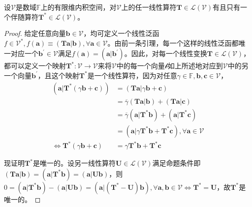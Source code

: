 \documentclass[main.tex]{subfiles}
\begin{document}
\begin{theorem}
设$\mathcal{V}$是数域$\mathbb{F}$上的有限维内积空间，对$\mathcal{V}$上的任一线性算符$\mathbf{T}\in\mathcal{L}\left(\mathcal{V}\right)$有且只有一个伴随算符$\mathbf{T}^*\in\mathcal{L}\left(\mathcal{V}\right)$。
\end{theorem}
\begin{proof}
给定任意向量$\mathbf{b}\in\mathcal{V}$，均可定义一个线性泛函$f\in\mathcal{V}^*,f\left(\mathbf{a}\right)\equiv\left(\mathbf{Ta}|\mathbf{b}\right),\forall\mathbf{a}\in\mathcal{V}$。由前一条引理，每一个这样的线性泛函都唯一对应一个$\mathbf{b}^\prime\in\mathcal{V}$满足$f\left(\mathbf{a}\right)=\left(\mathbf{a}|\mathbf{b}^\prime\right)$。因此，对每一个线性变换$\mathbf{T}\in\mathcal{L}\left(\mathcal{V}\right)$，都可以定义一个映射$\mathbf{T}^*:\mathcal{V}\rightarrow\mathcal{V}$来将$\mathcal{V}$中的每一个向量$\mathcal{b}$如上所述地对应到$\mathcal{V}$中的另一个向量$\mathbf{b}^\prime$，且这个映射$\mathbf{T}^*$是一个线性算符，因为对任意$\gamma\in\mathbb{F},\mathbf{b},\mathbf{c}\in\mathcal{V}$，
\begin{align*}
    \left(\mathbf{a}|\mathbf{T}^*\left(\gamma\mathbf{b}+\mathbf{c}\right)\right)&=\left(\mathbf{Ta}|\gamma\mathbf{b}+\mathbf{c}\right)\\
    &=\overline{\gamma}\left(\mathbf{Ta}|\mathbf{b}\right)+\left(\mathbf{Ta}|\mathbf{c}\right)\\
    &=\overline{\gamma}\left(\mathbf{a}|\mathbf{T}^*\mathbf{b}\right)+\left(\mathbf{a}|\mathbf{T}^*\mathbf{c}\right)\\
    &=\left(\mathbf{a}|\gamma\mathbf{T}^*\mathbf{b}+\mathbf{T}^*\mathbf{c}\right),\forall\mathbf{a}\in\mathcal{V}\\
    \Leftrightarrow\mathbf{T}^*\left(\gamma\mathbf{b}+\mathbf{c}\right)&=\gamma\mathbf{T}^*\mathbf{b}+\mathbf{T}^*\mathbf{c}
\end{align*}

现证明$\mathbf{T}^*$是唯一的。设另一线性算符$\mathbf{U}\in\mathcal{L}\left(\mathcal{V}\right)$满足命题条件即$\left(\mathbf{Ta}|\mathbf{b}\right)=\left(\mathbf{a}|\mathbf{T}^*\mathbf{b}\right)=\left(\mathbf{a}|\mathbf{Ub}\right)$，则$0=\left(\mathbf{a}|\mathbf{T}^*\mathbf{b}\right)-\left(\mathbf{a}|\mathbf{Ub}\right)=\left(\mathbf{a}|\left(\mathbf{T}^*-\mathbf{U}\right)\mathbf{b}\right),\forall\mathbf{a},\mathbf{b}\in\mathcal{V}\Leftrightarrow\mathbf{T}^*=\mathbf{U}$，故$\mathbf{T}^*$是唯一的。
\end{proof}
\end{document}
